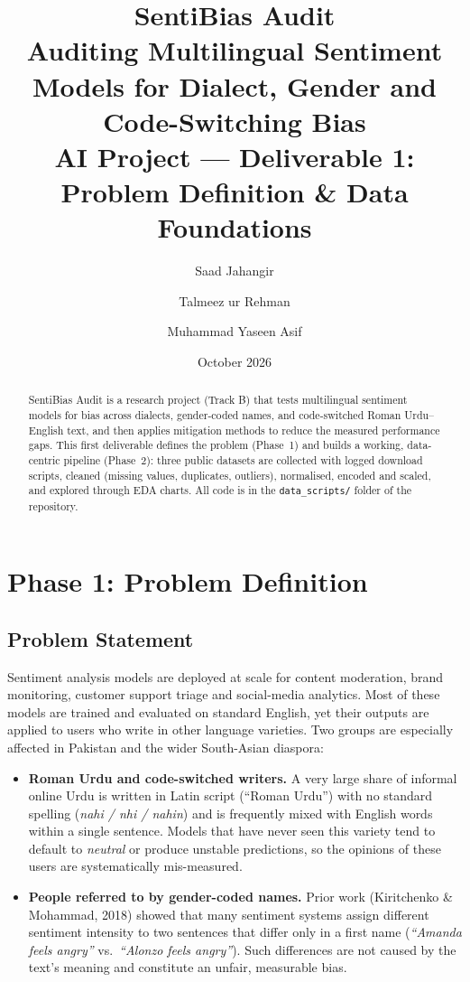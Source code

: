 \documentclass[11pt,a4paper]{article}
\title{\textbf{SentiBias Audit}\\[4pt]
\large Auditing Multilingual Sentiment Models for Dialect, Gender and Code-Switching Bias\\[6pt]
\normalsize AI Project --- Deliverable 1: Problem Definition \& Data Foundations}
\author{Saad Jahangir \and Talmeez ur Rehman \and Muhammad Yaseen Asif}
\date{October 2026}
\begin{document}
\maketitle

\begin{abstract}
SentiBias Audit is a research project (Track B) that tests multilingual sentiment models for
bias across dialects, gender-coded names, and code-switched Roman Urdu--English text, and then
applies mitigation methods to reduce the measured performance gaps. This first deliverable
defines the problem (Phase~1) and builds a working, data-centric pipeline (Phase~2): three
public datasets are collected with logged download scripts, cleaned (missing values, duplicates,
outliers), normalised, encoded and scaled, and explored through EDA charts. All code is in the
\texttt{data\_scripts/} folder of the repository.
\end{abstract}

\section{Phase 1: Problem Definition}

\subsection{Problem Statement}
Sentiment analysis models are deployed at scale for content moderation, brand monitoring, customer
support triage and social-media analytics. Most of these models are trained and evaluated on
standard English, yet their outputs are applied to users who write in other language varieties.
Two groups are especially affected in Pakistan and the wider South-Asian diaspora:

\begin{itemize}
  \item \textbf{Roman Urdu and code-switched writers.} A very large share of informal online
        Urdu is written in Latin script (``Roman Urdu'') with no standard spelling
        (\emph{nahi / nhi / nahin}) and is frequently mixed with English words within a single
        sentence. Models that have never seen this variety tend to default to \emph{neutral} or
        produce unstable predictions, so the opinions of these users are systematically
        mis-measured.
  \item \textbf{People referred to by gender-coded names.} Prior work (Kiritchenko \& Mohammad,
        2018) showed that many sentiment systems assign different sentiment intensity to two
        sentences that differ only in a first name (\emph{``Amanda feels angry''} vs.\
        \emph{``Alonzo feels angry''}). Such differences are not caused by the text's meaning and
        constitute an unfair, measurable bias.
\end{itemize}
\end{document}
